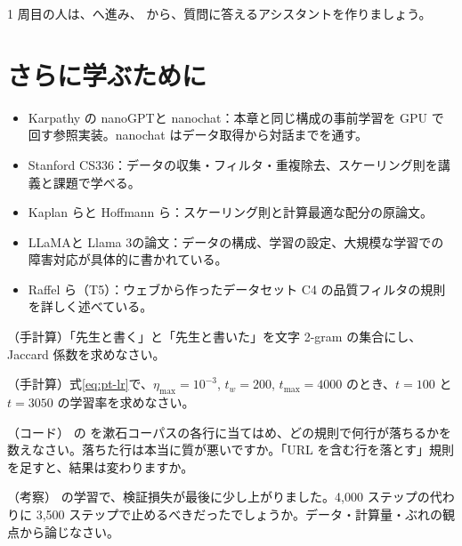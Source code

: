 1 周目の人は、へ進み、 から、質問に答えるアシスタントを作りましょう。

\section*{さらに学ぶために}

\begin{itemize}
\item Karpathy の nanoGPT\cite{karpathy2022nanogpt}と nanochat\cite{karpathy2025nanochat}：本章と同じ構成の事前学習を GPU で回す参照実装。nanochat はデータ取得から対話までを通す。
\item Stanford CS336\cite{cs336}：データの収集・フィルタ・重複除去、スケーリング則を講義と課題で学べる。
\item Kaplan ら\cite{kaplan2020scaling}と Hoffmann ら\cite{hoffmann2022training}：スケーリング則と計算最適な配分の原論文。
\item LLaMA\cite{touvron2023llama}と Llama 3\cite{dubey2024llama3}の論文：データの構成、学習の設定、大規模な学習での障害対応が具体的に書かれている。
\item Raffel ら（T5）\cite{raffel2020exploring}：ウェブから作ったデータセット C4 の品質フィルタの規則を詳しく述べている。
\end{itemize}

\begin{exercises}
\item （手計算）「先生と書く」と「先生と書いた」を文字 2-gram の集合にし、Jaccard 係数を求めなさい。
\item （手計算）式\eqref{eq:pt-lr}で、$\eta_{\max}=10^{-3}$, $t_w=200$, $t_{\max}=4000$ のとき、$t=100$ と $t=3050$ の学習率を求めなさい。
\item （コード） の  を漱石コーパスの各行に当てはめ、どの規則で何行が落ちるかを数えなさい。落ちた行は本当に質が悪いですか。「URL を含む行を落とす」規則を足すと、結果は変わりますか。
\item （考察） の学習で、検証損失が最後に少し上がりました。4,000 ステップの代わりに 3,500 ステップで止めるべきだったでしょうか。データ・計算量・ぶれの観点から論じなさい。
\end{exercises}
